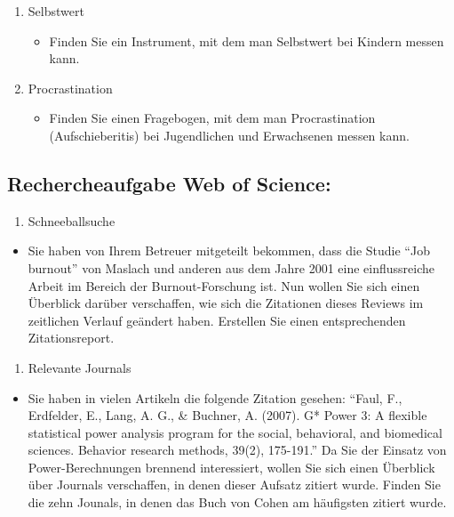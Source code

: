 \documentclass[
]{book}
\providecommand{\tightlist}{%
  \setlength{\itemsep}{0pt}\setlength{\parskip}{0pt}}
\begin{document}
\begin{enumerate}
\def\labelenumi{\arabic{enumi}.}
\setcounter{enumi}{1}
\item
  Selbstwert

  \begin{itemize}
  \tightlist
  \item
    Finden Sie ein Instrument, mit dem man Selbstwert bei Kindern messen kann.
  \end{itemize}
\item
  Procrastination

  \begin{itemize}
  \tightlist
  \item
    Finden Sie einen Fragebogen, mit dem man Procrastination (Aufschieberitis) bei Jugendlichen und Erwachsenen messen kann.
  \end{itemize}
\end{enumerate}

\hypertarget{rechercheaufgabe-web-of-science}{%
\subsection{Rechercheaufgabe Web of Science:}\label{rechercheaufgabe-web-of-science}}

\begin{enumerate}
\def\labelenumi{\arabic{enumi}.}
\tightlist
\item
  Schneeballsuche
\end{enumerate}

\begin{itemize}
\tightlist
\item
  Sie haben von Ihrem Betreuer mitgeteilt bekommen, dass die Studie ``Job burnout'' von Maslach und anderen aus dem Jahre 2001 eine einflussreiche Arbeit im Bereich der Burnout-Forschung ist. Nun wollen Sie sich einen Überblick darüber verschaffen, wie sich die Zitationen dieses Reviews im zeitlichen Verlauf geändert haben. Erstellen Sie einen entsprechenden Zitationsreport.
\end{itemize}

\begin{enumerate}
\def\labelenumi{\arabic{enumi}.}
\setcounter{enumi}{1}
\tightlist
\item
  Relevante Journals
\end{enumerate}

\begin{itemize}
\tightlist
\item
  Sie haben in vielen Artikeln die folgende Zitation gesehen: ``Faul, F., Erdfelder, E., Lang, A. G., \& Buchner, A. (2007). G* Power 3: A flexible statistical power analysis program for the social, behavioral, and biomedical sciences. Behavior research methods, 39(2), 175-191.'' Da Sie der Einsatz von Power-Berechnungen brennend interessiert, wollen Sie sich einen Überblick über Journals verschaffen, in denen dieser Aufsatz zitiert wurde. Finden Sie die zehn Jounals, in denen das Buch von Cohen am häufigsten zitiert wurde.
\end{itemize}
\end{document}
